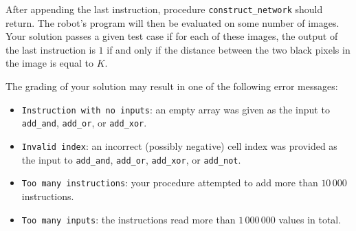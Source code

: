 After appending the last instruction, procedure \texttt{construct\_network} should return.
The robot's program will then be evaluated on some number of images.
Your solution passes a given test case if for each of these images, the output of the last instruction is $1$ if and only if the distance between the two black pixels in the image is equal to $K$.

The grading of your solution may result in one of the following error messages:

\begin{itemize}
\item \texttt{Instruction with no inputs}: an empty array was given as the input to \texttt{add\_and}, \texttt{add\_or}, or \texttt{add\_xor}.
\item \texttt{Invalid index}: an incorrect (possibly negative) cell index was provided as the input to  \texttt{add\_and}, \texttt{add\_or}, \texttt{add\_xor}, or \texttt{add\_not}.
\item \texttt{Too many instructions}: your procedure attempted to add more than $10\,000$ instructions.
\item \texttt{Too many inputs}: the instructions read more than $1\,000\,000$ values in total.
\end{itemize}



